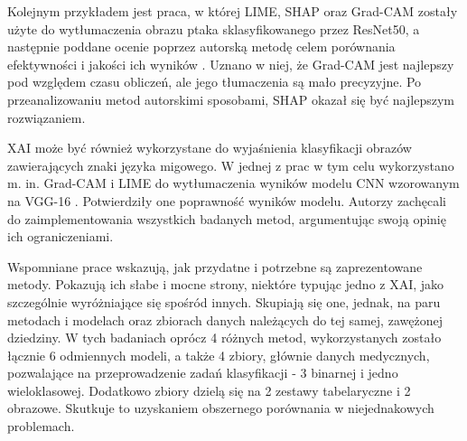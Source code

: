 Kolejnym przykładem jest praca, w której LIME, SHAP oraz Grad-CAM zostały użyte do wytłumaczenia obrazu ptaka sklasyfikowanego przez ResNet50, a następnie poddane ocenie poprzez autorską metodę celem porównania efektywności i jakości ich wyników \cite{lime_shap_gradcam_research_images}. Uznano w niej, że Grad-CAM jest najlepszy pod względem czasu obliczeń, ale jego tłumaczenia są mało precyzyjne. Po przeanalizowaniu metod autorskimi sposobami, SHAP okazał się być najlepszym rozwiązaniem. 

XAI może być również wykorzystane do wyjaśnienia klasyfikacji obrazów zawierających znaki języka migowego. W jednej z prac w tym celu wykorzystano m. in. Grad-CAM i LIME do wytłumaczenia wyników modelu CNN wzorowanym na VGG-16 \cite{f98f8c14ef8e4c75a13839b615f87993}. Potwierdziły one poprawność wyników modelu. Autorzy zachęcali do zaimplementowania wszystkich badanych metod, argumentując swoją opinię ich ograniczeniami.

Wspomniane prace wskazują, jak przydatne i potrzebne są zaprezentowane metody. Pokazują ich słabe i mocne strony, niektóre typując jedno z XAI, jako szczególnie wyróżniające się spośród innych. Skupiają się one, jednak, na paru metodach i modelach oraz zbiorach danych należących do tej samej, zawężonej dziedziny. W tych badaniach oprócz 4 różnych metod, wykorzystanych zostało łącznie 6 odmiennych modeli, a także 4 zbiory, głównie danych medycznych, pozwalające na przeprowadzenie zadań klasyfikacji - 3 binarnej i jedno wieloklasowej. Dodatkowo zbiory dzielą się na 2 zestawy tabelaryczne i 2 obrazowe. Skutkuje to uzyskaniem obszernego porównania w niejednakowych problemach.


